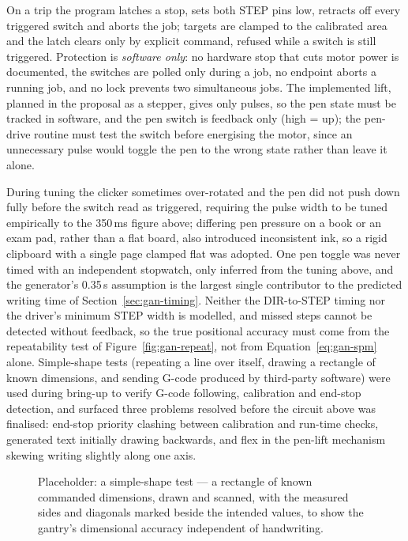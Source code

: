 On a trip the program latches a stop, sets both STEP pins low, retracts off every triggered switch and aborts the job; targets are clamped to the calibrated area and the latch clears only by explicit command, refused while a switch is still triggered. Protection is \emph{software only}: no hardware stop that cuts motor power is documented, the switches are polled only during a job, no endpoint aborts a running job, and no lock prevents two simultaneous jobs. The implemented lift, planned in the proposal as a stepper, gives only pulses, so the pen state must be tracked in software, and the pen switch is feedback only (high = up); the pen-drive routine must test the switch before energising the motor, since an unnecessary pulse would toggle the pen to the wrong state rather than leave it alone.

During tuning the clicker sometimes over-rotated and the pen did not push down fully before the switch read as triggered, requiring the pulse width to be tuned empirically to the 350\,ms figure above; differing pen pressure on a book or an exam pad, rather than a flat board, also introduced inconsistent ink, so a rigid clipboard with a single page clamped flat was adopted. One pen toggle was never timed with an independent stopwatch, only inferred from the tuning above, and the generator's 0.35\,s assumption is the largest single contributor to the predicted writing time of Section~\ref{sec:gan-timing}. Neither the DIR-to-STEP timing nor the driver's minimum STEP width is modelled, and missed steps cannot be detected without feedback, so the true positional accuracy must come from the repeatability test of Figure~\ref{fig:gan-repeat}, not from Equation~\ref{eq:gan-spm} alone.
Simple-shape tests (repeating a line over itself, drawing a rectangle of known dimensions, and sending G-code produced by third-party software) were used during bring-up to verify G-code following, calibration and end-stop detection, and surfaced three problems resolved before the circuit above was finalised: end-stop priority clashing between calibration and run-time checks, generated text initially drawing backwards, and flex in the pen-lift mechanism skewing writing slightly along one axis.

\begin{figure}[htb]
\centering
{}
\captionsetup{singlelinecheck=false,justification=justified}
\caption{Placeholder: a simple-shape test --- a rectangle of known commanded dimensions, drawn and scanned, with the measured sides and diagonals marked beside the intended values, to show the gantry's dimensional accuracy independent of handwriting.}
\label{fig:gan-rect}
\end{figure}


